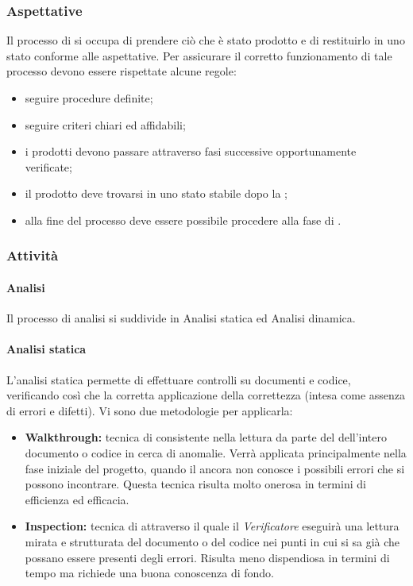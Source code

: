 \subsubsection{Aspettative}
Il processo di  si occupa di prendere ciò che è stato prodotto e di restituirlo in uno stato conforme alle aspettative. Per assicurare il corretto funzionamento di tale processo devono essere rispettate alcune regole:
\begin{itemize}
	\item seguire procedure definite;
	\item seguire criteri chiari ed affidabili;
	\item i prodotti devono passare attraverso fasi successive opportunamente verificate;
	\item il prodotto deve trovarsi in uno stato stabile dopo la ;
	\item alla fine del processo deve essere possibile procedere alla fase di .
\end{itemize}
\subsubsection{Attività}
\paragraph{Analisi}
\label{Analisi}
Il processo di analisi si suddivide in Analisi statica ed Analisi dinamica.
\paragraph{Analisi statica}
L'analisi statica permette di effettuare controlli su documenti e codice, verificando così che la corretta applicazione della correttezza (intesa come assenza di errori e difetti). Vi sono due metodologie per applicarla:
\begin{itemize}
	\item \textbf{Walkthrough:} tecnica di  consistente nella lettura da parte del  dell'intero documento o codice in cerca di anomalie. Verrà applicata principalmente nella fase iniziale del progetto, quando il  ancora non conosce i possibili errori che si possono incontrare. Questa tecnica risulta molto onerosa in termini di efficienza ed efficacia.
	\item \textbf{Inspection:} tecnica di  attraverso il quale il \textit{Verificatore} eseguirà una lettura mirata e strutturata del documento o del codice nei punti in cui si sa già che possano essere presenti degli errori. Risulta meno dispendiosa in termini di tempo ma richiede una buona conoscenza di fondo.
\end{itemize}
